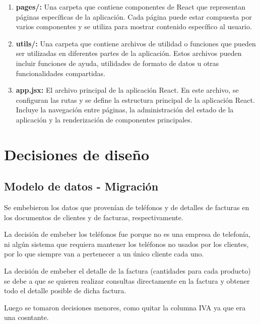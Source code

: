\documentclass[a4paper,12pt]{article}
\begin{document}
\begin{enumerate}
\begin{enumerate}
			\item \textbf{pages/:} Una carpeta que contiene componentes de React que representan páginas específicas de la aplicación. Cada página puede estar compuesta por varios componentes y se utiliza para mostrar contenido específico al usuario.
			
			\item \textbf{utils/:} Una carpeta que contiene archivos de utilidad o funciones que pueden ser utilizadas en diferentes partes de la aplicación. Estos archivos pueden incluir funciones de ayuda, utilidades de formato de datos u otras funcionalidades compartidas.
			
			\item \textbf{app.jsx:} El archivo principal de la aplicación React. En este archivo, se configuran las rutas y se define la estructura principal de la aplicación React. Incluye la navegación entre páginas, la administración del estado de la aplicación y la renderización de componentes principales.
		\end{enumerate}
	\end{enumerate}

	\newpage
	
	\section{Decisiones de diseño}
	
	\subsection {Modelo de datos - Migración}
	
	Se embebieron los datos que provenían de teléfonos y de detalles de facturas en los documentos de clientes y de facturas, respectivamente.
	
	\bigskip
	
	La decisión de embeber los teléfonos fue porque no es una empresa de telefonía, ni algún sistema que requiera mantener los teléfonos no usados por los clientes, por lo que siempre van a pertenecer a un único cliente cada uno.
	
	\bigskip
	
	La decisión de embeber el detalle de la factura (cantidades para cada producto) se debe a que se quieren realizar consultas directamente en la factura y obtener todo el detalle posible de dicha factura.
	
	\bigskip
	
	Luego se tomaron decisiones menores, como quitar la columna IVA ya que era una cosntante.
	
\end{document}
